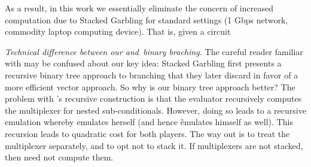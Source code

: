 As a result, in this work we essentially eliminate the concern of increased computation due to Stacked Garbling for standard settings (1 Gbps network, commodity laptop computing device).   That is, given a circuit



{\em Technical difference between our and~\HK binary braching.}
The careful reader familiar with \cite{EPRINT:HeaKol20b} may be
confused about our key idea: Stacked Garbling first presents a
recursive binary tree approach to branching that they later
discard in favor of a more efficient vector approach.
So why is our binary tree approach better?
The problem with \cite{EPRINT:HeaKol20b}'s recursive construction
is that the evaluator recursively computes the multiplexer for
nested sub-conditionals.
However, doing so leads to a recursive emulation whereby \E
emulates herself (and hence \G emulates himself as well).
This recursion leads to quadratic cost for both players.
The way out is to treat the multiplexer separately, and to opt not
to stack it.
If multiplexers are not stacked, then \E need not compute them.




